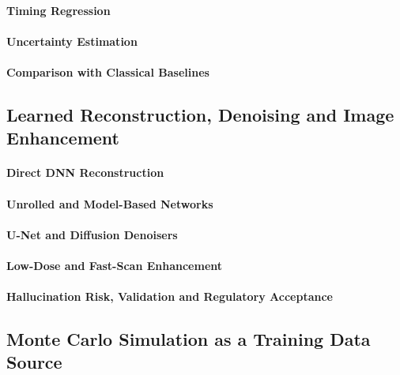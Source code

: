 \paragraph{Timing Regression}

\paragraph{Uncertainty Estimation}

\paragraph{Comparison with Classical Baselines}

\subsection{Learned Reconstruction, Denoising and Image Enhancement}
\label{sec:learned-recon}

\paragraph{Direct DNN Reconstruction}

\paragraph{Unrolled and Model-Based Networks}

\paragraph{U-Net and Diffusion Denoisers}

\paragraph{Low-Dose and Fast-Scan Enhancement}

\paragraph{Hallucination Risk, Validation and Regulatory Acceptance}

\subsection{Monte Carlo Simulation as a Training Data Source}

